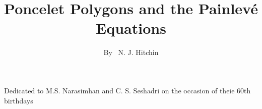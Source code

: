 \title{Poncelet Polygons and the Painlev\'e Equations}

\author{By~ N. J. Hitchin}

\date{}
\maketitle

\begin{center}
Dedicated to M.S. Narasimhan and C. S. Seshadri on the occasion of theie 60th birthdays
\end{center}
